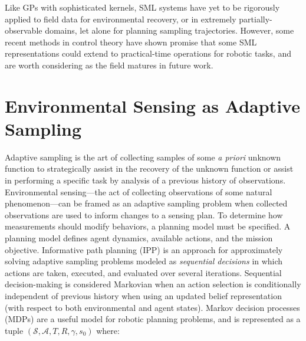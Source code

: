 Like GPs with sophisticated kernels, SML systems have yet to be rigorously applied to field data for environmental recovery, or in extremely partially-observable domains, let alone for planning sampling trajectories. However, some recent methods in control theory \autocite{chee2022knode,jiahaoonline,gan2020data} have shown promise that some SML representations could extend to practical-time operations for robotic tasks, and are worth considering as the field matures in future work.




\section{Environmental Sensing as Adaptive Sampling}
\label{sec:ipp}
Adaptive sampling is the art of collecting samples of some \emph{a priori} unknown function to strategically assist in the recovery of the unknown function or assist in performing a specific task by analysis of a previous history of observations. Environmental sensing---the act of collecting observations of some natural phenomenon---can be framed as an adaptive sampling problem when collected observations are used to inform changes to a sensing plan. To determine how measurements should modify behaviors, a planning model must be specified. A planning model defines agent dynamics, available actions, and the mission objective. Informative path planning (IPP) is an approach for approximately solving adaptive sampling problems modeled as \emph{sequential decisions} in which actions are taken, executed, and evaluated over several iterations. Sequential decision-making is considered Markovian when an action selection is conditionally independent of previous history when using an updated belief representation (with respect to both environmental and agent states). Markov decision processes \autocite{howard1960dynamic,bellman1957markovian} (MDPs) are a useful model for robotic planning problems, and is represented as a tuple $(\mathcal{S}, \mathcal{A}, T, R, \gamma, s_0)$ where:

